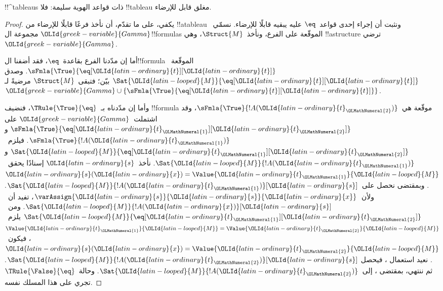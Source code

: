 \documentclass[../../../include/open-logic-section]{subfiles}
\begin{document}


\begin{prop}
!!^{tableau}s ذات قواعد الهوية سليمة: فلا !!{tableau} مغلق قابل للإرضاء.
\end{prop}

\begin{proof}
يكفي، على ما تقدّم، أن نأخذ فرعًا قابلًا للإرضاء من !!a{tableau}
ونثبت أن إجراء إحدى قواعد~$\eq$ عليه يبقيه قابلًا للإرضاء.
نسمّي~${\OLId{greek-variable}{Gamma}}$ مجموعة ال!!{formula}s الموقّعة على الفرع،
ونأخذ~$\Struct{M}$، وهي !!a{structure} ترضي~${\OLId{greek-variable}{Gamma}}$.

أما إن مدّدنا الفرع بقاعدة~$\eq$، فقد أضفنا ال!!{formula}
الموقّعة~$\sFmla{\True}{\eq[{\OLId{latin-ordinary}{t}}][{\OLId{latin-ordinary}{t}}]}$. وصدق
$\Sat{{\OLId{latin-looped}{M}}}{\eq[{\OLId{latin-ordinary}{t}}][{\OLId{latin-ordinary}{t}}]}$ بيّن؛ فتبقى~$\Struct{M}$ مرضيةً
لـ~${\OLId{greek-variable}{Gamma}} \cup
\{\sFmla{\True}{\eq[{\OLId{latin-ordinary}{t}}][{\OLId{latin-ordinary}{t}}]}\}$.

وأما إن مدّدناه بـ~$\TRule{\True}{\eq}$، فنضيف !!{formula}
موقّعة هي~$\sFmla{\True}{!A({\OLId{latin-ordinary}{t}}_{\OLMathNumeral{2}})}$، وقد اشتملت~${\OLId{greek-variable}{Gamma}}$ على
$\sFmla{\True}{\eq[{\OLId{latin-ordinary}{t}}_{\OLMathNumeral{1}}][{\OLId{latin-ordinary}{t}}_{\OLMathNumeral{2}}]}$ و$\sFmla{\True}{!A({\OLId{latin-ordinary}{t}}_{\OLMathNumeral{1}})}$.
فيلزم~$\Sat{{\OLId{latin-looped}{M}}}{\eq[{\OLId{latin-ordinary}{t}}_{\OLMathNumeral{1}}][{\OLId{latin-ordinary}{t}}_{\OLMathNumeral{2}}]}$ و$\Sat{{\OLId{latin-looped}{M}}}{!A({\OLId{latin-ordinary}{t}}_{\OLMathNumeral{1}})}$.
نأخذ~${\OLId{latin-ordinary}{s}}$ إسنادًا يحقق~${\OLId{latin-ordinary}{s}}({\OLId{latin-ordinary}{x}}) = \Value{{\OLId{latin-ordinary}{t}}_{\OLMathNumeral{1}}}{{\OLId{latin-looped}{M}}}$.
وبمقتضى 
نحصل على~$\Sat{{\OLId{latin-looped}{M}}}{!A({\OLId{latin-ordinary}{t}}_{\OLMathNumeral{1}})}[{\OLId{latin-ordinary}{s}}]$. ولأن~$\varAssign{{\OLId{latin-ordinary}{s}}}{{\OLId{latin-ordinary}{s}}}{{\OLId{latin-ordinary}{x}}}$،
تفيد  أن~$\Sat{{\OLId{latin-looped}{M}}}{!A({\OLId{latin-ordinary}{x}})}[{\OLId{latin-ordinary}{s}}]$.
ومن~$\Sat{{\OLId{latin-looped}{M}}}{\eq[{\OLId{latin-ordinary}{t}}_{\OLMathNumeral{1}}][{\OLId{latin-ordinary}{t}}_{\OLMathNumeral{2}}]}$ يلزم~$\Value{{\OLId{latin-ordinary}{t}}_{\OLMathNumeral{1}}}{{\OLId{latin-looped}{M}}} = \Value{{\OLId{latin-ordinary}{t}}_{\OLMathNumeral{2}}}{{\OLId{latin-looped}{M}}}$،
فيكون~${\OLId{latin-ordinary}{s}}({\OLId{latin-ordinary}{x}}) = \Value{{\OLId{latin-ordinary}{t}}_{\OLMathNumeral{2}}}{{\OLId{latin-looped}{M}}}$. نعيد استعمال
، فيحصل
$\Sat{{\OLId{latin-looped}{M}}}{!A({\OLId{latin-ordinary}{t}}_{\OLMathNumeral{2}})}[{\OLId{latin-ordinary}{s}}]$. ثم ننتهي، بمقتضى
، إلى~$\Sat{{\OLId{latin-looped}{M}}}{!A({\OLId{latin-ordinary}{t}}_{\OLMathNumeral{2}})}$.
وحالة~$\TRule{\False}{\eq}$ تجري على هذا المسلك نفسه.
\end{proof}
\end{document}
